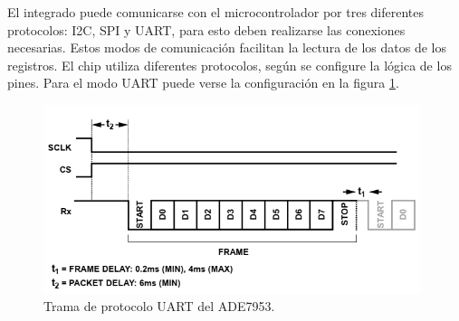 El integrado puede comunicarse con el microcontrolador por tres diferentes protocolos: I2C, SPI y UART, para esto deben realizarse las conexiones necesarias. Estos modos de comunicación facilitan la lectura de los datos de los registros. El chip utiliza diferentes protocolos, según se configure la lógica de los pines. Para el modo UART puede verse la configuración en la figura \ref{fig:UARTADE7953}.

\begin{figure}[h]
	\centering
	\includegraphics[width=110mm,keepaspectratio]{Figures/tramauartade.png}
	\caption{Trama de protocolo UART del ADE7953.}
	\label{fig:UARTADE7953}
\end{figure}








